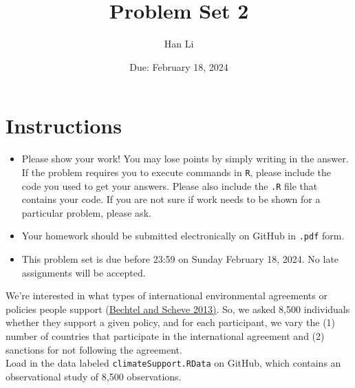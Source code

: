 \documentclass[12pt,letterpaper]{article}
\title{Problem Set 2}
\date{Due: February 18, 2024}
\author{Han Li}
\begin{document}
	\maketitle
	\section*{Instructions}
	\begin{itemize}
		\item Please show your work! You may lose points by simply writing in the answer. If the problem requires you to execute commands in \texttt{R}, please include the code you used to get your answers. Please also include the \texttt{.R} file that contains your code. If you are not sure if work needs to be shown for a particular problem, please ask.
		\item Your homework should be submitted electronically on GitHub in \texttt{.pdf} form.
		\item This problem set is due before 23:59 on Sunday February 18, 2024. No late assignments will be accepted.
	\end{itemize}

	
	

	\vspace{.25cm}
\noindent We're interested in what types of international environmental agreements or policies people support (\href{https://www.pnas.org/content/110/34/13763}{Bechtel and Scheve 2013)}. So, we asked 8,500 individuals whether they support a given policy, and for each participant, we vary the (1) number of countries that participate in the international agreement and (2) sanctions for not following the agreement. \\

\noindent Load in the data labeled \texttt{climateSupport.RData} on GitHub, which contains an observational study of 8,500 observations.
\end{document}
